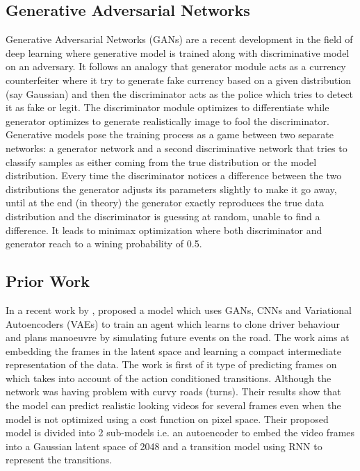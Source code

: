 \documentclass[a4paper,11pt,titlepage,drop]{article}%
\begin{document}
\subsection{Generative Adversarial Networks} 

Generative Adversarial Networks (GANs) \cite{gans} are a recent development in the field of deep learning where generative model is trained along with discriminative model on an adversary. It follows an analogy that generator module acts as a currency counterfeiter where it try to generate fake currency based on a given distribution (say Gaussian) and then the discriminator acts as the police which tries to detect it as fake or legit. The discriminator module optimizes to differentiate while generator optimizes to generate realistically image to fool the discriminator. Generative models pose the training process as a game between two separate networks: a generator network and a second discriminative network that tries to classify samples as either coming from the true distribution or the model distribution. Every time the discriminator notices a difference between the two distributions the generator adjusts its parameters slightly to make it go away, until at the end (in theory) the generator exactly reproduces the true data distribution and the discriminator is guessing at random, unable to find a difference. It leads to minimax optimization where both discriminator and generator reach to a wining probability of 0.5.

\subsection{Prior Work} 
In a recent work by , proposed a model which uses GANs, CNNs and Variational Autoencoders (VAEs) to train an agent which learns to clone driver behaviour and plans manoeuvre by simulating future events on the road. The work aims at embedding the frames in the latent space and learning a compact intermediate representation of the data. The work is first of it type of predicting frames on which takes into account of the action conditioned transitions. Although the network was having problem with curvy roads (turns). Their results show that the model can predict realistic looking videos for several frames even when the model is not optimized using a cost function on pixel space. Their proposed model is divided into 2 sub-models i.e. an autoencoder to embed the video frames into a Gaussian latent space of 2048 and a transition model using RNN to represent the transitions.
\end{document}
